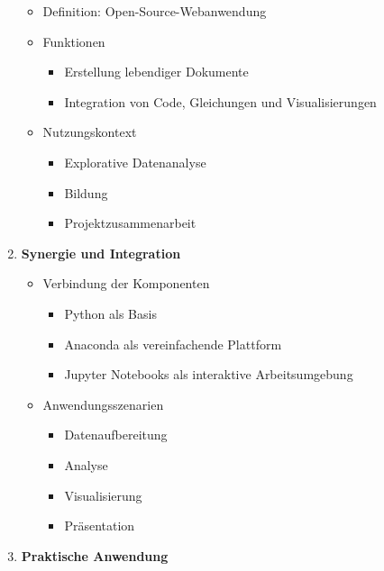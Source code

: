 \documentclass{vorlage-design-main}
\begin{document}
\begin{enumerate}
  \begin{itemize}
  
  \item
    Definition: Open-Source-Webanwendung
  \item
    Funktionen

    \begin{itemize}
    
    \item
      Erstellung lebendiger Dokumente
    \item
      Integration von Code, Gleichungen und Visualisierungen
    \end{itemize}
  \item
    Nutzungskontext

    \begin{itemize}
    
    \item
      Explorative Datenanalyse
    \item
      Bildung
    \item
      Projektzusammenarbeit
    \end{itemize}
  \end{itemize}
\item
  \textbf{Synergie und Integration}

  \begin{itemize}
  
  \item
    Verbindung der Komponenten

    \begin{itemize}
    
    \item
      Python als Basis
    \item
      Anaconda als vereinfachende Plattform
    \item
      Jupyter Notebooks als interaktive Arbeitsumgebung
    \end{itemize}
  \item
    Anwendungsszenarien

    \begin{itemize}
    
    \item
      Datenaufbereitung
    \item
      Analyse
    \item
      Visualisierung
    \item
      Präsentation
    \end{itemize}
  \end{itemize}
\item
  \textbf{Praktische Anwendung}


\end{enumerate}
\end{document}

